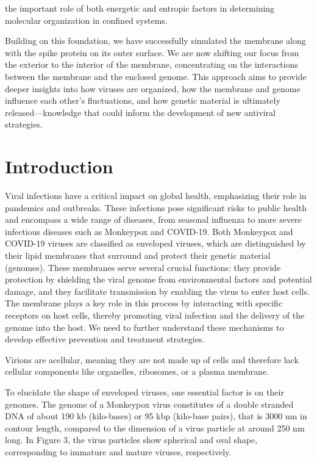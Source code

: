 \documentclass[12pt]{article}
\begin{document}
\begin{flushleft}
 \noindent  the important role of both energetic and entropic factors in determining molecular organization in confined systems.


Building on this foundation, we have successfully simulated the membrane along with the spike protein on its outer surface. We are now shifting our focus from the exterior to the interior of the membrane, concentrating on the interactions between the membrane and the enclosed genome. This approach aims to provide deeper insights into how viruses are organized, how the membrane and genome influence each other’s fluctuations, and how genetic material is ultimately released—knowledge that could inform the development of new antiviral strategies.




\section*{Introduction}




Viral infections have a critical impact on global health, emphasizing their role in pandemics and outbreaks. These infections pose significant risks to public health and encompass a wide range of diseases, from seasonal influenza to more severe infectious diseases such as Monkeypox and COVID-19. Both Monkeypox and COVID-19 viruses are classified as enveloped viruses, which are distinguished by their lipid membranes that surround and protect their genetic material (genomes). These membranes serve several crucial functions: they provide protection by shielding the viral genome from environmental factors and potential damage, and they facilitate transmission by enabling the virus to enter host cells. The membrane plays a key role in this process by interacting with specific receptors on host cells, thereby promoting viral infection and the delivery of the genome into the host. We need to further understand these mechanisms to develop effective prevention and treatment strategies.




Virions are acellular, meaning they are not made up of cells and therefore lack cellular components like organelles, ribosomes, or a plasma membrane. 

To elucidate the shape of enveloped viruses, one essential factor is on their genomes. The genome of a Monkeypox virus constitutes of a double stranded DNA of about 190 kb (kilo-bases) or 95 kbp (kilo-base pairs), that is 3000 nm in contour length, compared to the dimension of a virus particle at around 250 nm long\cite{erez2019diagnosis}\cite{parker2007human}. In Figure 3, the virus particles show spherical and oval shape, corresponding to immature and mature viruses, respectively.


\end{flushleft}
\end{document}

